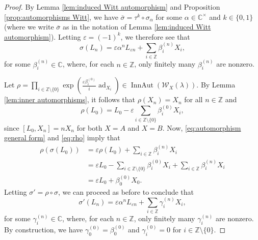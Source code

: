 \documentclass[11pt, svgnames]{amsart}
\DeclareMathOperator{\ad}{ad}
\newcommand{\ZZ}{\mathbb{Z}}
\newcommand{\CC}{\mathbb{C}}
\newcommand{\W}{\mathcal{W}}
\DeclareMathOperator{\InnAut}{InnAut}
\newcommand{\nonzero}{\setminus \{0\}}
\theoremstyle{definition}
\begin{document}
\begin{proof}
    By Lemma \ref{lem:induced Witt automorphism} and Proposition \ref{prop:automorphisms Witt}, we have $\overline{\sigma} = \tau^k \circ \sigma_{\alpha}$ for some $\alpha \in \CC^\times$ and $k \in \{0,1\}$ (where we write $\overline{\sigma}$ as in the notation of Lemma \ref{lem:induced Witt automorphism}). Letting $\varepsilon = (-1)^k$, we therefore see that
    \begin{equation}\label{eq:automorphism general form}
        \sigma(L_n) = \varepsilon \alpha^n L_{\varepsilon n} + \sum_{i \in \ZZ} \beta_i^{(n)} X_i,
    \end{equation}
    for some $\beta_i^{(n)} \in \CC$, where, for each $n \in \ZZ$, only finitely many $\beta_i^{(n)}$ are nonzero.

    Let $\rho = \prod_{i \in \ZZ \nonzero} \exp(\frac{\varepsilon \beta_i^{(0)}}{i} \ad_{X_i}) \in \InnAut(\W_X(\lambda))$. By Lemma \ref{lem:inner automorphisms}, it follows that $\rho(X_n) = X_n$ for all $n \in \ZZ$ and
    \begin{equation}\label{eq:rho}
        \rho(L_0) = L_0 - \varepsilon \sum_{i\in \ZZ \nonzero} \beta_i^{(0)}X_i,
    \end{equation}
    since $[L_0,X_n] = nX_n$ for both $X = A$ and $X = B$. Now, \eqref{eq:automorphism general form} and \eqref{eq:rho} imply that
    \begin{align*}
        \rho(\sigma(L_0)) &= \varepsilon \rho(L_0) + \sum_{i \in \ZZ} \beta_i^{(n)} X_i \\
        &= \varepsilon L_0 - \sum_{i\in \ZZ \nonzero} \beta_i^{(0)}X_i + \sum_{i \in \ZZ} \beta_i^{(n)} X_i \\
        &= \varepsilon L_0 + \beta_0^{(0)} X_0.
    \end{align*}
    Letting $\sigma' = \rho \circ \sigma$, we can proceed as before to conclude that
    \begin{equation}\label{eq:sigma'}
        \sigma'(L_n) = \varepsilon \alpha^n L_{\varepsilon n} + \sum_{i \in \ZZ} \gamma_i^{(n)} X_i,
    \end{equation}
    for some $\gamma_i^{(n)} \in \CC$, where, for each $n \in \ZZ$, only finitely many $\gamma_i^{(n)}$ are nonzero. By construction, we have $\gamma_0^{(0)} = \beta_0^{(0)}$ and $\gamma_i^{(0)} = 0$ for $i \in \ZZ \nonzero$.


\end{proof}
\end{document}
